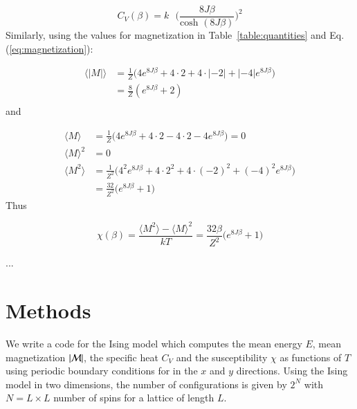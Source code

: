 \documentclass{article}
\begin{document}
\begin{multicols}{2}
\begin{equation}
	C_V(\beta) = k \textrm{ } \bigg( \frac{8J\beta}{\textrm{cosh }(8J\beta)} \bigg)^2
\end{equation}
Similarly, using the values for magnetization in Table~\ref{table:quantities} and Eq. (\ref{eq:magnetization}):

\begin{equation}
\begin{aligned}
	\langle|M|\rangle 	&= \frac{1}{Z} \bigg( 4e^{8J\beta} + 4\cdot2 + 4\cdot|-2| + |-4|e^{8J\beta} \bigg) \\
			&= \frac{8}{Z}(e^{8J\beta} + 2) \\
\end{aligned}
\end{equation}
and

\begin{equation}
\begin{aligned}
	\langle M\rangle 		&= \frac{1}{Z} \bigg( 4e^{8J\beta} + 4\cdot2 - 4\cdot2 - 4e^{8J\beta} \bigg) = 0 \\
	\langle M\rangle^2 	&= 0 \\
	\langle M^2\rangle 	&= \frac{1}{Z^2} \bigg( 4^2 e^{8J\beta} + 4\cdot2^2 + 4\cdot(-2)^2 + (-4)^2e^{8J\beta}   \bigg) \\
			&= \frac{32}{Z^2} \bigg( e^{8J\beta} + 1  \bigg)
\end{aligned}
\end{equation}
Thus

\begin{equation}
	\chi(\beta) = \frac{\langle M^2\rangle - \langle M\rangle^2}{kT} = \frac{32 \beta}{Z^2} \bigg(e^{8J\beta} + 1  \bigg)
\end{equation}




... 










\section{Methods}

We write a code for the Ising model which computes the mean energy $E$, mean magnetization $|{\cal M}|$, the specific heat $C_V$ and the susceptibility $\chi$ as functions of  $T$ using periodic boundary conditions for in the $x$ and $y$ directions. Using the Ising model in two dimensions, the number of configurations is given by $2^N$ with $N = L \times L$ number of spins for a lattice of length $L$. 


\end{multicols}
\end{document}
